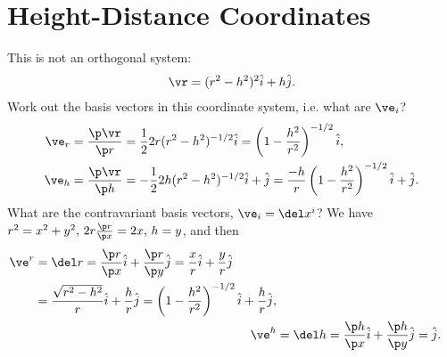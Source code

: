 \documentclass[a4paper, 11pt, normalem]{report}
\begin{document}
\section{Height-Distance Coordinates}
\begin{figure}[H]
    \centering
\end{figure}
This is not an orthogonal system:
\begin{align}
    \vr = (r^2-h^2)^2\hat{i} + h\hat{j}.
\end{align}
Work out the basis vectors in this coordinate system, i.e. what are $\ve_i$?
\begin{align}
    \ve_r &= \frac{\p\vr}{\p r} = \frac12 2r(r^2-h^2)^{-1/2}\hat{i} = \left(1-\frac{h^2}{r^2}\right)^{-1/2}\hat{i},\\
    \ve_h &= \frac{\p\vr}{\p h} =-\frac12 2h(r^2-h^2)^{-1/2}\hat{i} + \hat{j} = \frac{-h}{r}\left(1-\frac{h^2}{r^2}\right)^{-1/2}\hat{i}+\hat{j}.
\end{align}
What are the contravariant basis vectors, $\ve_i=\del x^i$?
We have $r^2=x^2+y^2,\,2r\frac{\p r}{\p x}=2x,\, h=y$, and then
\begin{align}
    \begin{split}
        \ve^r &= \del r = \frac{\p r}{\p x}\hat{i} + \frac{\p r}{\p y}\hat{j} = \frac{x}{r}\hat{i} + \frac{y}{r}\hat{j} \\
              &= \frac{\sqrt{r^2-h^2}}{r}\hat{i}+\frac{h}{r}\hat{j}=\left(1-\frac{h^2}{r^2}\right)^{-1/2}\hat{i}+\frac{h}{r}\hat{j},
    \end{split}\\
        \ve^h &= \del h = \frac{\p h}{\p x}\hat{i} + \frac{\p h}{\p y}\hat{j} = \hat{j}.
\end{align}
\end{document}
